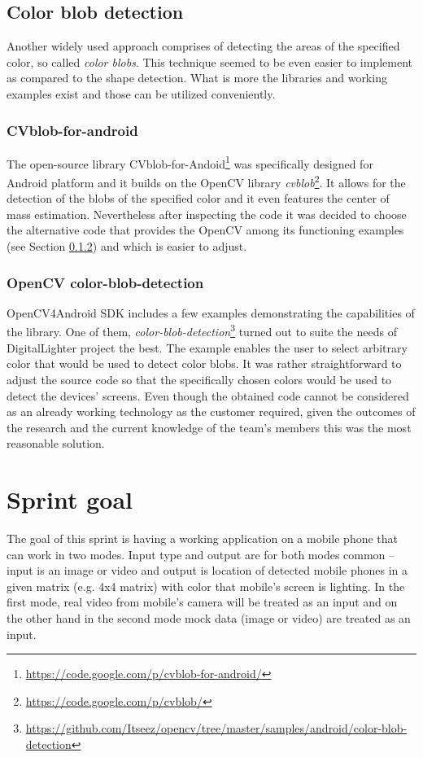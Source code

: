 \subsection{Color blob detection}
Another widely used approach comprises of detecting the areas of the specified color, so called \textit{color blobs}. This technique seemed to be even easier to implement as compared to the shape detection. What is more the libraries and working examples exist and those can be utilized conveniently.

\subsubsection{CVblob-for-android}
The open-source library CVblob-for-Andoid\footnote{\url{https://code.google.com/p/cvblob-for-android/}} was specifically designed for Android platform and it builds on the OpenCV library \textit{cvblob}\footnote{\url{https://code.google.com/p/cvblob/}}. It allows for the detection of the blobs of the specified color and it even features the center of mass estimation. Nevertheless after inspecting the code it was decided to choose the alternative code that provides the OpenCV among its functioning examples (see Section \ref{txt:sprint3_openCVcolorblob}) and which is easier to adjust.

\subsubsection{OpenCV color-blob-detection} \label{txt:sprint3_openCVcolorblob}
OpenCV4Android SDK includes a few examples demonstrating the capabilities of the library. One of them, \textit{color-blob-detection}\footnote{\url{https://github.com/Itseez/opencv/tree/master/samples/android/color-blob-detection}} turned out to suite the needs of DigitalLighter project the best. The example enables the user to select arbitrary color that would be used to detect color blobs. It was rather straightforward to adjust the source code so that the specifically chosen colors would be used to detect the devices' screens. Even though the obtained code cannot be considered as an already working technology as the customer required, given the outcomes of the research and the current knowledge of the team's members this was the most reasonable solution.




\section{Sprint goal}
The goal of this sprint is having a working application on a mobile phone that can work in two modes.  
Input type and output are for both modes common -- input is an image or video and output is location of detected mobile phones in a given matrix (e.g. 4x4 matrix) with color that mobile's screen is lighting.
In the first mode, real video from mobile's camera will be treated as an input and on the other hand in the second mode mock data (image or video) are treated as an input.

